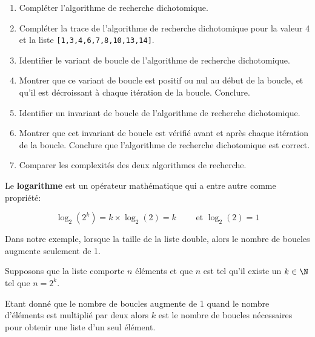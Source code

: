 \begin{exercice_cours}{}
	\begin{enumerate}
		\item Compléter l'algorithme de recherche dichotomique.
		\item Compléter la trace de l'algorithme de recherche dichotomique pour la valeur 4 et la liste \verb+[1,3,4,6,7,8,10,13,14]+.
		\item Identifier le variant de boucle de l'algorithme de recherche dichotomique.
		\item Montrer que ce variant de boucle est positif ou nul au début de la boucle, et qu'il est décroissant à chaque itération de la boucle. Conclure.
		\item Identifier un invariant de boucle de l'algorithme de recherche dichotomique.
		\item Montrer que cet invariant de boucle est vérifié avant et après chaque itération de la boucle. Conclure que l'algorithme de recherche dichotomique est correct.
		\item Comparer les complexités des deux algorithmes de recherche.
	\end{enumerate}
\end{exercice_cours}


\begin{definition}[Le logarithme]
	Le \textbf{logarithme} est un opérateur mathématique qui a entre autre comme propriété:

	\[
	\log_2(2^k) = k \times \log_2(2)=k \qquad \textrm{ et } \log_2(2) = 1
	\]
\end{definition}

	Dans notre exemple, lorsque la taille de la liste double, alors le nombre de boucles augmente seulement de 1.

	Supposons que la liste comporte $n$ éléments et que $n$ est tel qu'il existe un $k\in\N$ tel que $n=2^k$.

	Etant donné que le nombre de boucles augmente de 1 quand le nombre d'éléments est multiplié par deux alors $k$ est le nombre de boucles nécessaires pour obtenir une liste d'un seul élément.
	
\smallskip

